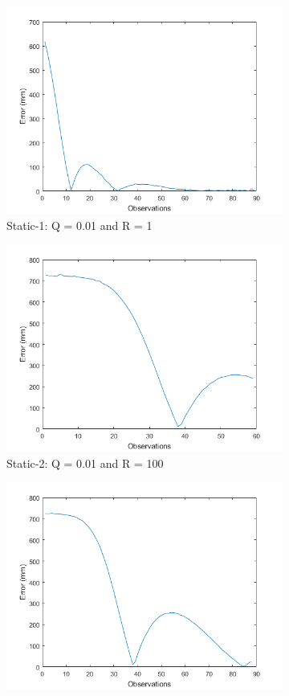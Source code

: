 \begin{figure}[ht!]
\begin{subfigure}{.5\textwidth}
  \centering
  \includegraphics[width=.8\linewidth]{Images/kalman_plots/static_1.png}
  \caption{Static-1: Q = 0.01 and R = 1}
  \label{fig:sfig1}
\end{subfigure}
\begin{subfigure}{.5\textwidth}
  \centering
  \includegraphics[width=.8\linewidth]{Images/kalman_plots/static_2.png}
  \caption{Static-2: Q = 0.01 and R = 100}
  \label{fig:sfig2}
\end{subfigure}
\begin{subfigure}{.5\textwidth}
  \centering
  \includegraphics[width=.8\linewidth]{Images/kalman_plots/static_3.png}

\end{subfigure}
\end{figure}
